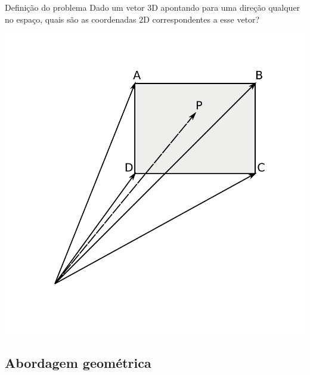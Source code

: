 \documentclass{beamer}
\begin{document}
\begin{frame}{Definição do problema}
	\pause
	Dado um vetor 3D apontando para uma direção qualquer no espaço,
	quais são as coordenadas 2D correspondentes a esse vetor?
	\pause
	\bigskip
	\begin{center}
	\includegraphics[keepaspectratio, width=1.0\textwidth, height=0.5\textheight, clip, trim=0.75in 0.75in 0.70in 0.50in]{../monografia/img/geometria_ABCD1.pdf}
	\end{center}
\end{frame}


\subsection{Abordagem geométrica}
\end{document}
